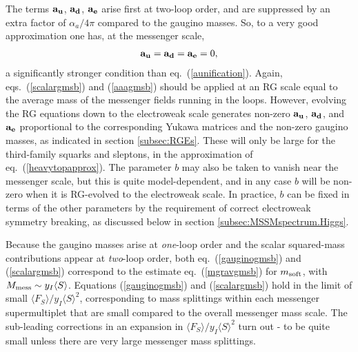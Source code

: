 \documentclass[11pt]{article}
\def\beq{\begin{eqnarray}}
\def\eeq{\end{eqnarray}}
\begin{document}
The terms $\bf a_u$, $\bf a_d$, $\bf a_e$ arise first at two-loop order, 
and are suppressed by an extra factor of $\alpha_a/4 \pi$ compared to the 
gaugino masses. So, to a very good approximation one has, at the messenger 
scale,
\beq
{\bf a_u} = {\bf a_d} = {\bf a_e} = 0,
\label{aaagmsb}
\eeq
a significantly stronger condition than eq.~(\ref{aunification}). Again, 
eqs.~(\ref{scalargmsb}) and (\ref{aaagmsb}) should be applied at an RG 
scale equal to the average mass of the messenger fields running in the 
loops. However, evolving the RG equations down to the electroweak scale 
generates non-zero $\bf a_u$, $\bf a_d$, and $\bf a_e$ proportional to the 
corresponding Yukawa matrices and the non-zero gaugino masses, as 
indicated in section \ref{subsec:RGEs}. These will only be large for the 
third-family squarks and sleptons, in the approximation of 
eq.~(\ref{heavytopapprox}). The parameter $b$ may also be taken to vanish 
near the messenger scale, but this is quite model-dependent, and in any 
case $b$ will be non-zero when it is RG-evolved to the electroweak scale. 
In practice, $b$ can be fixed in terms of the other parameters
by the requirement of correct electroweak 
symmetry breaking, as discussed below in section 
\ref{subsec:MSSMspectrum.Higgs}.

Because the gaugino masses arise at {\it one}-loop order and the scalar 
squared-mass contributions appear at {\it two}-loop order, both 
eq.~(\ref{gauginogmsb}) and (\ref{scalargmsb}) correspond to the estimate 
eq.~(\ref{mgravgmsb}) for $m_{\rm soft}$, with $M_{\rm mess} \sim y_I 
\langle S \rangle$. Equations (\ref{gauginogmsb}) and (\ref{scalargmsb}) 
hold in the limit of small $\langle F_S \rangle /y_I\langle S \rangle^2$, 
corresponding to mass splittings within each messenger supermultiplet that 
are small compared to the overall messenger mass scale. The sub-leading 
corrections in an expansion in $\langle F_S \rangle /y_I\langle S 
\rangle^2$ turn out \cite{gmsbcorrA}-\cite{gmsbcorrC} 
to be quite small unless there 
are very large messenger mass splittings.
\end{document}
